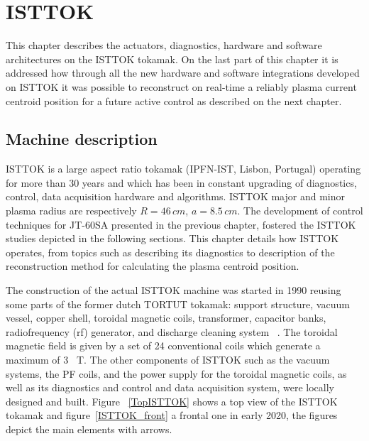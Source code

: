 \chapter{ISTTOK }

This chapter describes the actuators, diagnostics, hardware and software architectures   on the  ISTTOK tokamak. On the last part of this chapter it is addressed how through all the new hardware and software integrations developed on ISTTOK it was possible to reconstruct on real-time a reliably plasma current centroid position for a future active control as described on the next chapter.  

\section{Machine description}
ISTTOK is a large aspect ratio tokamak (IPFN-IST, Lisbon, Portugal) operating for more than 30 years and which has been in constant upgrading of diagnostics, control, data acquisition hardware and  algorithms. ISTTOK major and minor plasma radius are respectively $R= 46 \, cm$, $a= 8.5 \, cm$. The development of control techniques for  JT-60SA presented in the previous chapter, fostered the  ISTTOK  studies  depicted in the following sections. This chapter details how ISTTOK operates, from topics such as describing its diagnostics to description of the reconstruction method for calculating the plasma centroid position.\smallskip

The construction  of the actual ISTTOK machine was started in 1990 reusing some parts of the former dutch TORTUT tokamak: support structure, vacuum vessel, copper shell, toroidal magnetic coils, transformer, capacitor banks, radiofrequency (rf) generator, and discharge cleaning system ~\cite{Varandas1996}. The toroidal magnetic field is given by a set of 24 conventional coils which generate a maximum of 3~ T. The other components of ISTTOK such as the vacuum systems, the PF coils, and the power supply for the toroidal magnetic coils,  as well as its diagnostics and control and data acquisition system, were locally designed and built. Figure ~\ref{TopISTTOK} shows a top view of the ISTTOK tokamak and figure~\ref{ISTTOK_front} a frontal one in early 2020, the figures depict the main elements with arrows.\smallskip

